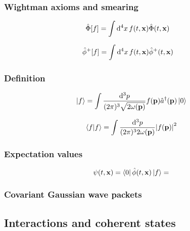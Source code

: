 \subsubsection{Wightman axioms and smearing}

\begin{align}
	\hat\Phi[f]
	&=
	\int\dd[4]{x}f(t,\vb{x})\hat\Phi(t,\vb{x})
\end{align}

\begin{align}
	\hat\phi^+[f]
	&=
	\int\dd[4]{x}
	f(t,\vb{x})
	\hat\phi^+(t,\vb{x})
\end{align}

\subsubsection{Definition}

\begin{equation}
	\ket{f}
	=
	\int\frac{\dd[3]{p}}{(2\pi)^3\sqrt{2\omega(\vb{p})}}
	f(\vb{p})\hat{a}^\dagger(\vb{p})\ket{0}
\end{equation}

\begin{equation}
	\bra{f}\ket{f}
	=
	\int\frac{\dd[3]{p}}{(2\pi)^32\omega(\vb{p})}
	\abs{f(\vb{p})}^2
\end{equation}

\subsubsection{Expectation values}

\begin{equation}
	\psi(t,\vb{x})
	=
	\bra{0}\hat\phi(t,\vb{x})\ket{f}
	=
\end{equation}

\subsubsection{Covariant Gaussian wave packets}

\subsection{Interactions and coherent states}
